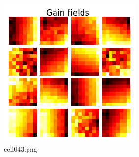 \begin{figure}[ht]
	\centering
	\includegraphics[scale=0.8, max width=\linewidth]{./fig/solve-credit-assignment-problem/backpropagation/cell043.png}
	\caption{cell043.png}
	\label{cell043.png}
\end{figure}
